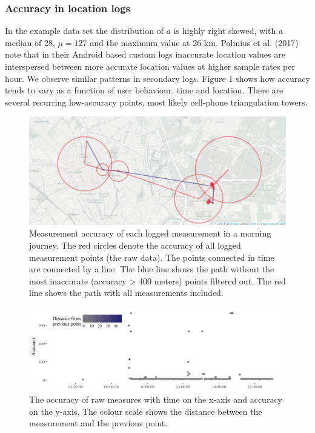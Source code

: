 \documentclass[english,man]{apa6}
\theoremstyle{definition}
\theoremstyle{definition}
\theoremstyle{definition}
\theoremstyle{remark}
\begin{document}
\subsubsection{Accuracy in location
logs}\label{accuracy-in-location-logs}

In the example data set the distribution of \(a\) is highly right
skewed, with a median of 28, \(\mu = 127\) and the maximum value at 26
km. Palmius et al. (2017) note that in their Android based custom logs
inaccurate location values are interspersed between more accurate
location values at higher sample rates per hour. We observe similar
patterns in secondary logs. Figure 1 shows how accuracy tends to vary as
a function of user behaviour, time and location. There are several
recurring low-accuracy points, most likely cell-phone triangulation
towers.

\begin{figure}
\includegraphics[width=1\linewidth]{img/journeyTillMiddayBoaz} \caption{Measurement accuracy of each logged measurement in a morning journey. The red circles denote the accuracy of all logged measurement points (the raw data). The points connected in time are connected by a line. The blue line shows the path without the most inaccurate (accuracy > 400 meters) points filtered out. The red line shows the path with all measurements included. }\label{fig:accuracyPlot}
\end{figure}

\begin{figure}
\includegraphics[width=1\linewidth]{img/accuracyLocShift} \caption{The accuracy of raw measures with time on the x-axis and accuracy on the y-axis. The colour scale shows the distance between the measurement and the previous point.}\label{fig:accuracyPlot2}
\end{figure}
\end{document}
